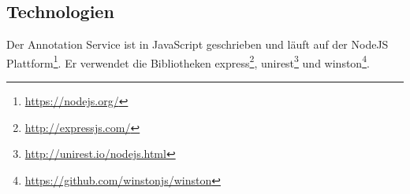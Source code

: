 \subsection{Technologien}
    Der Annotation Service ist in JavaScript geschrieben und läuft auf der
    NodeJS Plattform\footnote{\url{https://nodejs.org/}}.
    Er verwendet die Bibliotheken
    express\footnote{\url{http://expressjs.com/}},
    unirest\footnote{\url{http://unirest.io/nodejs.html}}
    und winston\footnote{\url{https://github.com/winstonjs/winston}}.